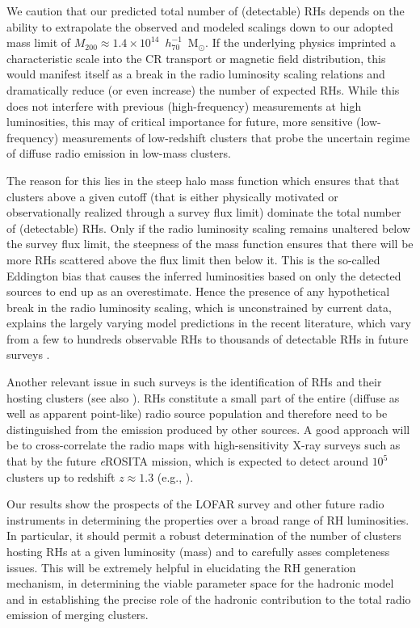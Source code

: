 \documentclass[useAMS,usenatbib]{mn2e}
\begin{document}
We caution that our predicted total number of (detectable) RHs depends on the
ability to extrapolate the observed and modeled scalings down to our adopted
mass limit of $M_{200}\approx1.4\times10^{14}$~$h_{70}^{-1}$~M$_{\odot}$. If the
underlying physics imprinted a characteristic scale into the CR transport or
magnetic field distribution, this would manifest itself as a break in the radio
luminosity scaling relations and dramatically reduce (or even increase) the
number of expected RHs.  While this does not interfere with previous
(high-frequency) measurements at high luminosities, this may of critical
importance for future, more sensitive (low-frequency) measurements of
low-redshift clusters that probe the uncertain regime of diffuse radio emission
in low-mass clusters.

The reason for this lies in the steep halo mass function which ensures that that
clusters above a given cutoff (that is either physically motivated or
observationally realized through a survey flux limit) dominate the total number
of (detectable) RHs. Only if the radio luminosity scaling remains unaltered
below the survey flux limit, the steepness of the mass function ensures that
there will be more RHs scattered above the flux limit then below it. This is the
so-called Eddington bias that causes the inferred luminosities based on only the
detected sources to end up as an overestimate. Hence the presence of any
hypothetical break in the radio luminosity scaling, which is unconstrained by
current data, explains the largely varying model predictions in the recent
literature, which vary from a few to hundreds observable RHs
\citep{2010A&A...509A..68C,2012arXiv1210.1020C,2011arXiv1110.2786S} to thousands 
of detectable RHs in future surveys \citep{2002A&A...396...83E}. 

Another relevant issue in such surveys is the identification of RHs and their
hosting clusters (see also \citealp{2010A&A...509A..68C}). RHs constitute a
small part of the entire (diffuse as well as apparent point-like) radio source
population and therefore need to be distinguished from the emission produced by
other sources. A good approach will be to cross-correlate the radio maps with
high-sensitivity X-ray surveys such as that by the future \emph{e}ROSITA mission, which
is expected to detect around $10^{5}$ clusters up to redshift $z \approx 1.3$
(e.g., \citealp{2011MSAIS..17..159C}).

Our results show the prospects of the LOFAR survey and other future radio
instruments in determining the properties over a broad range of RH luminosities.
In particular, it should permit a robust determination of the number of clusters
hosting RHs at a given luminosity (mass) and to carefully asses completeness
issues.  This will be extremely helpful in elucidating the RH generation
mechanism, in determining the viable parameter space for the hadronic model and
in establishing the precise role of the hadronic contribution to the total radio
emission of merging clusters.
\end{document}
